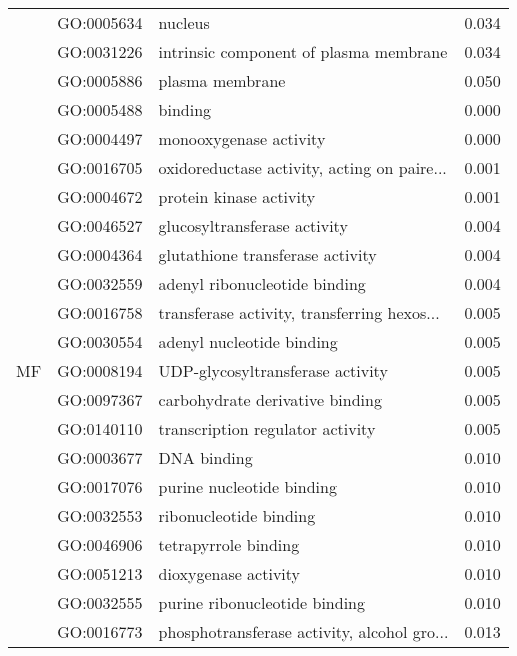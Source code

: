 \begin{longtable}{lllr}
   & GO:0005634 &                                      nucleus &         0.034 \\
   & GO:0031226 &       intrinsic component of plasma membrane &         0.034 \\
   & GO:0005886 &                              plasma membrane &         0.050 \\
\cline{1-4}
\multirow{27}{*}{MF} & GO:0005488 &                                      binding &         0.000 \\
   & GO:0004497 &                       monooxygenase activity &         0.000 \\
   & GO:0016705 &  oxidoreductase activity, acting on paire... &         0.001 \\
   & GO:0004672 &                      protein kinase activity &         0.001 \\
   & GO:0046527 &                 glucosyltransferase activity &         0.004 \\
   & GO:0004364 &             glutathione transferase activity &         0.004 \\
   & GO:0032559 &                adenyl ribonucleotide binding &         0.004 \\
   & GO:0016758 &  transferase activity, transferring hexos... &         0.005 \\
   & GO:0030554 &                    adenyl nucleotide binding &         0.005 \\
   & GO:0008194 &             UDP-glycosyltransferase activity &         0.005 \\
   & GO:0097367 &              carbohydrate derivative binding &         0.005 \\
   & GO:0140110 &             transcription regulator activity &         0.005 \\
   & GO:0003677 &                                  DNA binding &         0.010 \\
   & GO:0017076 &                    purine nucleotide binding &         0.010 \\
   & GO:0032553 &                       ribonucleotide binding &         0.010 \\
   & GO:0046906 &                         tetrapyrrole binding &         0.010 \\
   & GO:0051213 &                         dioxygenase activity &         0.010 \\
   & GO:0032555 &                purine ribonucleotide binding &         0.010 \\
   & GO:0016773 &  phosphotransferase activity, alcohol gro... &         0.013 \\

\end{longtable}
